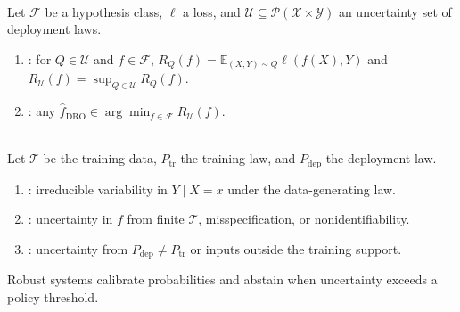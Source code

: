 \begin{definition} \label{def:sl-distributionally-robust-optimization} \\
Let $\mathcal{F}$ be a hypothesis class, $\ell$ a loss, and $\mathcal{U}\subseteq\mathcal{P}(\mathcal{X}\times\mathcal{Y})$ an uncertainty set of deployment laws.
\begin{enumerate}[label=(\roman*)]
\setlength{\itemsep}{0pt}
\item {}: for $Q\in\mathcal{U}$ and $f\in\mathcal{F}$, $R_Q(f)=\mathbb{E}_{(X,Y)\sim Q}\ell(f(X),Y)$ and $R_{\mathcal{U}}(f)=\sup_{Q\in\mathcal{U}}R_Q(f)$.
\item {}: any $\widehat f_{\mathrm{DRO}}\in\arg\min_{f\in\mathcal{F}}R_{\mathcal{U}}(f)$.
\end{enumerate}
\end{definition}

\begin{remark} \label{rem:sl-uncertainty-calibration} \\
Let $\mathcal{T}$ be the training data, $P_{\mathrm{tr}}$ the training law, and $P_{\mathrm{dep}}$ the deployment law.
\begin{enumerate}[label=(\roman*)]
\setlength{\itemsep}{0pt}
\item {}: irreducible variability in $Y\mid X=x$ under the data-generating law.
\item {}: uncertainty in $f$ from finite $\mathcal{T}$, misspecification, or nonidentifiability.
\item {}: uncertainty from $P_{\mathrm{dep}}\ne P_{\mathrm{tr}}$ or inputs outside the training support.
\end{enumerate}
Robust systems calibrate probabilities and abstain when uncertainty exceeds a policy threshold.
\end{remark}
